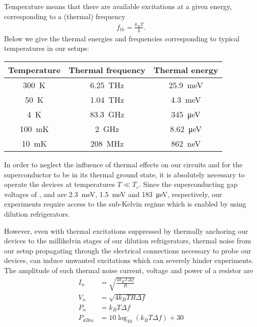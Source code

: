 Temperature means that there are available excitations at a given energy, corresponding to a (thermal) frequency
\begin{align}
f_{th}=\frac{k_B T}{h}.
\end{align}
Below we give the thermal energies and frequencies corresponding to typical temperatures in our setups:
\begin{center}
\begin{tabular}{ccc}
	\hline \hline
	Temperature & Thermal frequency & Thermal energy \\ 
	\hline 
	\SI{300}{\kelvin} & \SI{6.25}{\tera\hertz} & \SI{25.9}{\milli\electronvolt} \\ 
	\SI{50}{\kelvin} & \SI{1.04}{\tera\hertz} & \SI{4.3}{\milli\electronvolt} \\ 
	\SI{4}{\kelvin} & \SI{83.3}{\giga\hertz} & \SI{345}{\micro\electronvolt} \\ 
	\SI{100}{\milli\kelvin} & \SI{2}{\giga\hertz} & \SI{8.62}{\micro\electronvolt} \\ 
	\SI{10}{\milli\kelvin} & \SI{208}{\mega\hertz} & \SI{862}{\nano\electronvolt} \\ 
	\hline \hline
\end{tabular}
\end{center}

In order to neglect the influence of thermal effects on our circuits and for the superconductor to be in its thermal ground state, it is absolutely necessary to operate the devices at temperatures $T \ll T_c$.
Since the superconducting gap voltages of ,  and  are \SI{2.3}{\milli\electronvolt}, \SI{1.5}{\milli\electronvolt} and \SI{183}{\micro\electronvolt}, respectively, our experiments require access to the sub-Kelvin regime which is enabled by using dilution refrigerators.

However, even with thermal excitations suppressed by thermally anchoring our devices to the millikelvin stages of our dilution refrigerators, thermal noise from our setup propagating through the electrical connections necessary to probe our devices, can induce unwanted excitations which can severely hinder experiments.
The amplitude of such thermal noise current, voltage and power of a resistor are
\begin{align}
I_n &= \sqrt{\frac{4k_B T\Delta f}{R}} \\
V_n &= \sqrt{4k_B T R\Delta f} \\
P_n &= k_B T \Delta f \\
P_{dBm} &= 10\log_{10}(k_B T\Delta f)+30
\end{align}


